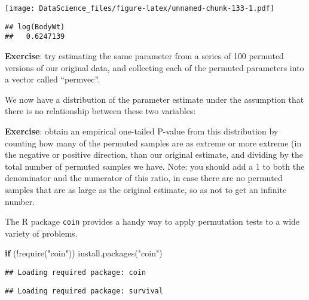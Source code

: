 \documentclass[
]{book}
\newenvironment{Shaded}{\begin{snugshade}}{\end{snugshade}}
\newcommand{\AttributeTok}[1]{\textcolor[rgb]{0.77,0.63,0.00}{#1}}
\newcommand{\ControlFlowTok}[1]{\textcolor[rgb]{0.13,0.29,0.53}{\textbf{#1}}}
\newcommand{\DecValTok}[1]{\textcolor[rgb]{0.00,0.00,0.81}{#1}}
\newcommand{\FunctionTok}[1]{\textcolor[rgb]{0.00,0.00,0.00}{#1}}
\newcommand{\NormalTok}[1]{#1}
\newcommand{\OtherTok}[1]{\textcolor[rgb]{0.56,0.35,0.01}{#1}}
\newcommand{\SpecialCharTok}[1]{\textcolor[rgb]{0.00,0.00,0.00}{#1}}
\newcommand{\StringTok}[1]{\textcolor[rgb]{0.31,0.60,0.02}{#1}}
\begin{document}
\texttt{[image: DataScience\_files/figure-latex/unnamed-chunk-133-1.pdf]}

\begin{Shaded}
\end{Shaded}

\begin{verbatim}
## log(BodyWt) 
##   0.6247139
\end{verbatim}

\textbf{Exercise}: try estimating the same parameter from a series of 100 permuted versions of our original data, and collecting each of the permuted parameters into a vector called ``permvec''.

We now have a distribution of the parameter estimate under the assumption that there is no relationship between these two variables:

\textbf{Exercise}: obtain an empirical one-tailed P-value from this distribution by counting how many of the permuted samples are as extreme or more extreme (in the negative or positive direction, than our original estimate, and dividing by the total number of permuted samples we have. Note: you should add a 1 to both the denominator and the numerator of this ratio, in case there are no permuted samples that are as large as the original estimate, so as not to get an infinite number.

The R package \texttt{coin} provides a handy way to apply permutation tests to a wide variety of problems.

\begin{Shaded}
\begin{Highlighting}[]
\ControlFlowTok{if}\NormalTok{ (}\SpecialCharTok{!}\FunctionTok{require}\NormalTok{(}\StringTok{"coin"}\NormalTok{)) }\FunctionTok{install.packages}\NormalTok{(}\StringTok{"coin"}\NormalTok{)}
\end{Highlighting}
\end{Shaded}

\begin{verbatim}
## Loading required package: coin
\end{verbatim}

\begin{verbatim}
## Loading required package: survival
\end{verbatim}
\end{document}

